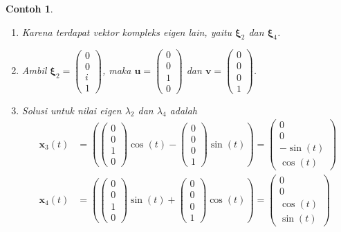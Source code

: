 \documentclass[a4paper]{article}
\theoremstyle{definisi}
\newtheorem{contoh}{Contoh}[subsection]
\newcommand{\bfxi}{\boldsymbol{\xi}}
\numberwithin{equation}{section}
\begin{document}
\begin{contoh}
\begin{enumerate}[label=Langkah \arabic*: ,leftmargin=*]
\begin{equation}
\begin{split}
        \end{split}
      \end{equation}
      \item Karena terdapat vektor kompleks eigen lain, yaitu $\bfxi_2$ dan $\bfxi_4$.
      \item Ambil $\bfxi_2 = \begin{pmatrix}0\\0\\i\\1\end{pmatrix}$, maka $\mathbf{u} = \begin{pmatrix}0\\0\\1\\0\end{pmatrix}$ dan $\mathbf{v} = \begin{pmatrix}0\\0\\0\\1\end{pmatrix}$.
      \item Solusi untuk nilai eigen $\lambda_2$ dan $\lambda_4$ adalah
      \begin{equation}\label{eq:contoh_pd_4_solusi_2}
        \begin{split}
          \mathbf{x}_3(t) &= \left(\begin{pmatrix}0\\0\\1\\0\end{pmatrix}\cos(t) - \begin{pmatrix}0\\0\\0\\1\end{pmatrix}\sin(t)\right) = \begin{pmatrix}0\\0\\-\sin(t)\\ \cos(t)\end{pmatrix}\\
          \mathbf{x}_4(t) &= \left(\begin{pmatrix}0\\0\\1\\0\end{pmatrix}\sin(t) + \begin{pmatrix}0\\0\\0\\1\end{pmatrix}\cos(t)\right) = \begin{pmatrix}0\\0\\ \cos(t)\\ \sin(t)\end{pmatrix}

\end{split}
\end{equation}
\end{enumerate}
\end{contoh}
\end{document}
